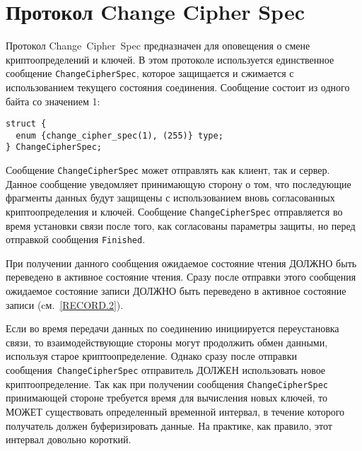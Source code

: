 \chapter{Протокол Change Cipher Spec}\label{CHANGE}

Протокол Change~Cipher~Spec предназначен для оповещения о смене 
криптоопределений и ключей. В этом протоколе используется единственное 
сообщение \lstinline{ChangeCipherSpec}, которое защищается и сжимается с 
использованием текущего состояния соединения. Сообщение состоит из одного 
байта со значением 1: 
\begin{lstlisting}
struct {
  enum {change_cipher_spec(1), (255)} type;
} ChangeCipherSpec;
\end{lstlisting}

Сообщение \lstinline{ChangeCipherSpec} может отправлять как клиент, так и 
сервер. Данное сообщение уведомляет принимающую сторону о том, что последующие 
фрагменты данных будут защищены с использованием вновь согласованных 
криптоопределения и ключей. Сообщение \lstinline{ChangeCipherSpec} 
отправляется во время установки связи после того, как согласованы 
параметры защиты, но перед отправкой сообщения \lstinline{Finished}. 

При получении данного сообщения ожидаемое состояние чтения ДОЛЖНО быть 
переведено в активное состояние чтения. Сразу после отправки этого 
сообщения ожидаемое состояние записи ДОЛЖНО быть переведено в активное 
состояние записи (cм.~\ref{RECORD.2}). 

Если во время передачи данных по соединению инициируется переустановка
связи, то взаимодействующие стороны могут продолжить обмен данными, 
используя старое криптоопределение. Однако сразу после отправки 
сообщения~\lstinline{ChangeCipherSpec} отправитель ДОЛЖЕН использовать новое 
криптоопределение. Так как при получении сообщения \lstinline{ChangeCipherSpec} 
принимающей стороне требуется время для вычисления новых ключей, то МОЖЕТ 
существовать определенный временной интервал, в течение которого 
получатель должен буферизировать данные. На практике, как правило, этот 
интервал довольно короткий.


